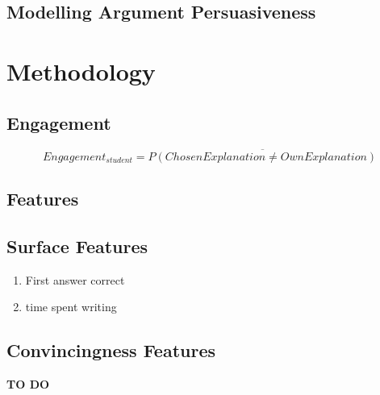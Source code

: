 \documentclass[sigconf]{acmart}
\begin{document}
\subsection{Modelling Argument Persuasiveness}




\section{Methodology}



\subsection{Engagement}


\begin{equation}
Engagement_{student} = 
\overline{P(ChosenExplanation \ne 
	OwnExplanation)} 
\label{eq:engagement_choose_peer}
\end{equation}



\subsection{Features}

\subsection{Surface Features}

	\begin{enumerate}
	\item First answer correct
	\item time spent writing
	\end{enumerate}


\subsection{Convincingness Features}


\begin{acks}
\textbf{TO DO}
\end{acks}



\end{document}
